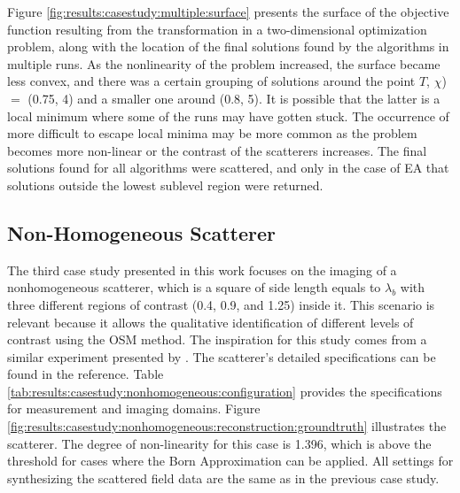 			Figure \ref{fig:results:casestudy:multiple:surface} presents the surface of the objective function resulting from the transformation in a two-dimensional optimization problem, along with the location of the final solutions found by the algorithms in multiple runs. As the nonlinearity of the problem increased, the surface became less convex, and there was a certain grouping of solutions around the point $T$, $\chi$) $=$ (0.75, 4) and a smaller one around (0.8, 5). It is possible that the latter is a local minimum where some of the runs may have gotten stuck. The occurrence of more difficult to escape local minima may be more common as the problem becomes more non-linear or the contrast of the scatterers increases. The final solutions found for all algorithms were scattered, and only in the case of EA that solutions outside the lowest sublevel region were returned.
		
		\subsection{Non-Homogeneous Scatterer}\label{chap:results:casestudy:nonhomogeneous}
		
			
			The third case study presented in this work focuses on the imaging of a nonhomogeneous scatterer, which is a square of side length equals to $\lambda_b$ with three different regions of contrast (0.4, 0.9, and 1.25) inside it. This scenario is relevant because it allows the qualitative identification of different levels of contrast using the OSM method. The inspiration for this study comes from a similar experiment presented by \cite{bevacqua2020physical}. The scatterer's detailed specifications can be found in the reference. Table \ref{tab:results:casestudy:nonhomogeneous:configuration} provides the specifications for measurement and imaging domains. Figure \ref{fig:results:casestudy:nonhomogeneous:reconstruction:groundtruth} illustrates the scatterer. The degree of non-linearity for this case is 1.396, which is above the threshold for cases where the Born Approximation can be applied. All settings for synthesizing the scattered field data are the same as in the previous case study.
			
